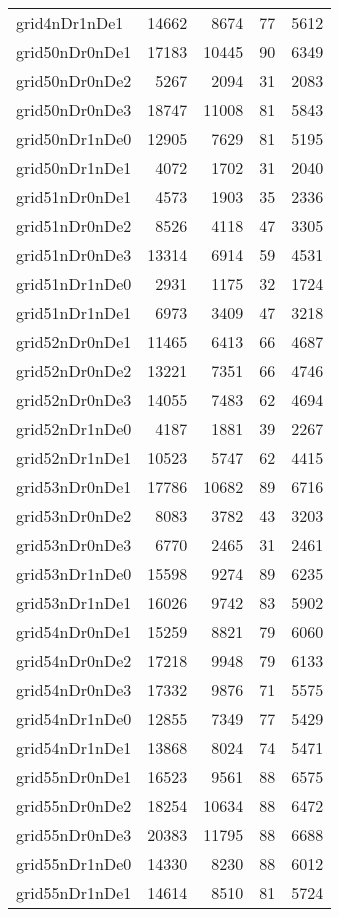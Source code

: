 \begin{longtable}{lrrrr}
grid4nDr1nDe1 & 14662 & 8674 & 77 & 5612 \\
grid50nDr0nDe1 & 17183 & 10445 & 90 & 6349 \\
grid50nDr0nDe2 & 5267 & 2094 & 31 & 2083 \\
grid50nDr0nDe3 & 18747 & 11008 & 81 & 5843 \\
grid50nDr1nDe0 & 12905 & 7629 & 81 & 5195 \\
grid50nDr1nDe1 & 4072 & 1702 & 31 & 2040 \\
grid51nDr0nDe1 & 4573 & 1903 & 35 & 2336 \\
grid51nDr0nDe2 & 8526 & 4118 & 47 & 3305 \\
grid51nDr0nDe3 & 13314 & 6914 & 59 & 4531 \\
grid51nDr1nDe0 & 2931 & 1175 & 32 & 1724 \\
grid51nDr1nDe1 & 6973 & 3409 & 47 & 3218 \\
grid52nDr0nDe1 & 11465 & 6413 & 66 & 4687 \\
grid52nDr0nDe2 & 13221 & 7351 & 66 & 4746 \\
grid52nDr0nDe3 & 14055 & 7483 & 62 & 4694 \\
grid52nDr1nDe0 & 4187 & 1881 & 39 & 2267 \\
grid52nDr1nDe1 & 10523 & 5747 & 62 & 4415 \\
grid53nDr0nDe1 & 17786 & 10682 & 89 & 6716 \\
grid53nDr0nDe2 & 8083 & 3782 & 43 & 3203 \\
grid53nDr0nDe3 & 6770 & 2465 & 31 & 2461 \\
grid53nDr1nDe0 & 15598 & 9274 & 89 & 6235 \\
grid53nDr1nDe1 & 16026 & 9742 & 83 & 5902 \\
grid54nDr0nDe1 & 15259 & 8821 & 79 & 6060 \\
grid54nDr0nDe2 & 17218 & 9948 & 79 & 6133 \\
grid54nDr0nDe3 & 17332 & 9876 & 71 & 5575 \\
grid54nDr1nDe0 & 12855 & 7349 & 77 & 5429 \\
grid54nDr1nDe1 & 13868 & 8024 & 74 & 5471 \\
grid55nDr0nDe1 & 16523 & 9561 & 88 & 6575 \\
grid55nDr0nDe2 & 18254 & 10634 & 88 & 6472 \\
grid55nDr0nDe3 & 20383 & 11795 & 88 & 6688 \\
grid55nDr1nDe0 & 14330 & 8230 & 88 & 6012 \\
grid55nDr1nDe1 & 14614 & 8510 & 81 & 5724 \\

\end{longtable}
